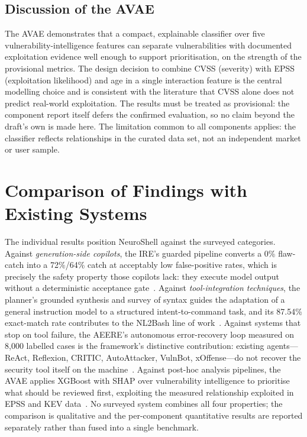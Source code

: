 \subsection{Discussion of the AVAE}\label{sec:results-avae-discussion}

The AVAE demonstrates that a compact, explainable classifier over five
vulnerability-intelligence features can separate vulnerabilities with documented
exploitation evidence well enough to support prioritisation, on the strength of
the provisional metrics. The design decision to combine CVSS (severity) with
EPSS (exploitation likelihood) and age in a single interaction feature is the
central modelling choice and is consistent with the literature that CVSS alone
does not predict real-world exploitation. The results must be treated as
provisional: the component report itself defers the confirmed evaluation, so no
claim beyond the draft's own is made here. The limitation common to all
components applies: the classifier reflects relationships in the curated data
set, not an independent market or user sample.

\section{Comparison of Findings with Existing Systems}\label{sec:results-existing}

The individual results position NeuroShell against the surveyed categories.
Against \emph{generation-side copilots}, the IRE's guarded pipeline converts a
0\% flaw-catch into a 72\%/64\% catch at acceptably low false-positive rates,
which is precisely the safety property those copilots lack: they execute model
output without a deterministic acceptance gate~\cite{deng2024pentestgpt}.
Against \emph{tool-integration techniques}, the planner's grounded synthesis and
survey of syntax guides the adaptation of a general instruction model to a
structured intent-to-command task, and its 87.54\% exact-match rate contributes
to the NL2Bash line of work~\cite{nl2bash2018,lewis2020rag}. Against systems
that stop on tool failure, the AEERE's autonomous error-recovery loop measured
on 8,000 labelled cases is the framework's distinctive contribution: existing
agents---ReAct, Reflexion, CRITIC, AutoAttacker, VulnBot, xOffense---do not
recover the security tool itself on the
machine~\cite{yao2023react,shinn2023reflexion,gou2024critic,autoattacker2024,
vulnbot2025,xoffense2025}. Against post-hoc analysis pipelines, the AVAE applies
XGBoost with SHAP over vulnerability intelligence to prioritise what should be
reviewed first, exploiting the measured relationship exploited in EPSS and KEV
data~\cite{jacobs2023epss,bozorgi2010beyond,sabottke2015vulnerability,
lundberg2017shap}. No surveyed system combines all four properties; the
comparison is qualitative and the per-component quantitative results are
reported separately rather than fused into a single benchmark.

